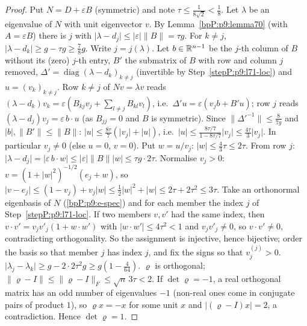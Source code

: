 \begin{proof}
Put $N=D+\varepsilon B$ (symmetric) and note $\tau\le\frac1{8\sqrt2}<\frac18$.
\label{stepP:p9:l71-loc} Let $\lambda$ be an eigenvalue of $N$ with unit eigenvector $v$. By Lemma~\ref{bpP:p9:lemma70} (with $A=\varepsilon B$) there is $j$ with $\lvert\lambda-d_j\rvert\le\lvert\varepsilon\rvert\lVert B\rVert=\tau g$. For $k\ne j$, $\lvert\lambda-d_k\rvert\ge g-\tau g\ge\frac78g$. Write $j=j(\lambda)$.
\label{stepP:p9:l71-eig} Let $b\in\mathbb{R}^{n-1}$ be the $j$-th column of $B$ without its (zero) $j$-th entry, $B'$ the submatrix of $B$ with row and column $j$ removed, $\Delta'=\operatorname{diag}(\lambda-d_k)_{k\ne j}$ (invertible by Step~\ref{stepP:p9:l71-loc}) and $u=(v_k)_{k\ne j}$. Row $k\ne j$ of $Nv=\lambda v$ reads $(\lambda-d_k)v_k=\varepsilon(B_{kj}v_j+\sum_{l\ne j}B_{kl}v_l)$, i.e.\ $\Delta'u=\varepsilon(v_jb+B'u)$; row $j$ reads $(\lambda-d_j)v_j=\varepsilon\,b\cdot u$ (as $B_{jj}=0$ and $B$ is symmetric). Since $\lVert\Delta'^{-1}\rVert\le\frac8{7g}$ and $\lvert b\rvert,\lVert B'\rVert\le\lVert B\rVert$: $\lvert u\rvert\le\frac{8\tau}7(\lvert v_j\rvert+\lvert u\rvert)$, i.e.\ $\lvert u\rvert\le\frac{8\tau/7}{1-8\tau/7}\lvert v_j\rvert\le\frac{4\tau}3\lvert v_j\rvert$. In particular $v_j\ne0$ (else $u=0$, $v=0$). Put $w=u/v_j$: $\lvert w\rvert\le\frac43\tau\le 2\tau$.
\label{stepP:p9:l71-ab} From row $j$: $\lvert\lambda-d_j\rvert=\lvert\varepsilon\,b\cdot w\rvert\le\lvert\varepsilon\rvert\lVert B\rVert\lvert w\rvert\le\tau g\cdot2\tau$. Normalise $v_j>0$: $v=(1+\lvert w\rvert^2)^{-1/2}(e_j+w)$, so $\lvert v-e_j\rvert\le(1-v_j)+v_j\lvert w\rvert\le\tfrac12\lvert w\rvert^2+\lvert w\rvert\le2\tau+2\tau^2\le3\tau$.
\label{stepP:p9:l71-bij} Take an orthonormal eigenbasis of $N$ (\ref{bpP:p9:e-spec}) and for each member the index $j$ of Step~\ref{stepP:p9:l71-loc}. If two members $v,v'$ had the same index, then $v\cdot v'=v_jv'_j(1+w\cdot w')$ with $\lvert w\cdot w'\rvert\le4\tau^2<1$ and $v_jv'_j\ne0$, so $v\cdot v'\ne0$, contradicting orthogonality. So the assignment is injective, hence bijective; order the basis so that member $j$ has index $j$, and fix the signs so that $v^{(j)}_j>0$.
\label{stepP:p9:l71-c} $\lvert\lambda_j-\lambda_k\rvert\ge g-2\cdot2\tau^2g\ge g(1-\tfrac4{64})$.
\label{stepP:p9:l71-so} $\varrho$ is orthogonal; $\lVert\varrho-I\rVert\le\lVert\varrho-I\rVert_F\le\sqrt n\,3\tau<2$. If $\det\varrho=-1$, a real orthogonal matrix has an odd number of eigenvalues $-1$ (non-real ones come in conjugate pairs of product $1$), so $\varrho x=-x$ for some unit $x$ and $\lvert(\varrho-I)x\rvert=2$, a contradiction. Hence $\det\varrho=1$.
\end{proof}

